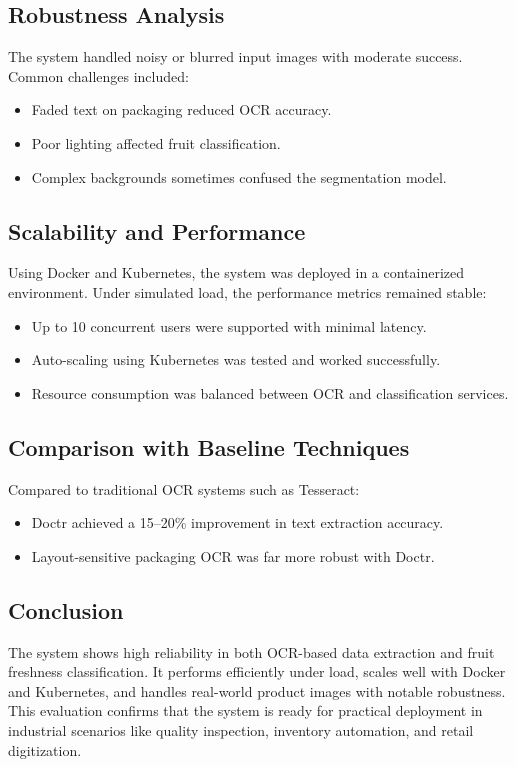 \documentclass[12pt]{report}
\begin{document}
\subsection{Robustness Analysis}

The system handled noisy or blurred input images with moderate success. Common challenges included:
\begin{itemize}
    \item Faded text on packaging reduced OCR accuracy.
    \item Poor lighting affected fruit classification.
    \item Complex backgrounds sometimes confused the segmentation model.
\end{itemize}

\subsection{Scalability and Performance}

Using Docker and Kubernetes, the system was deployed in a containerized environment. Under simulated load, the performance metrics remained stable:
\begin{itemize}
    \item Up to 10 concurrent users were supported with minimal latency.
    \item Auto-scaling using Kubernetes was tested and worked successfully.
    \item Resource consumption was balanced between OCR and classification services.
\end{itemize}

\subsection{Comparison with Baseline Techniques}

Compared to traditional OCR systems such as Tesseract:
\begin{itemize}
    \item Doctr achieved a 15–20\% improvement in text extraction accuracy.
    \item Layout-sensitive packaging OCR was far more robust with Doctr.
\end{itemize}

\subsection{Conclusion}

The system shows high reliability in both OCR-based data extraction and fruit freshness classification. It performs efficiently under load, scales well with Docker and Kubernetes, and handles real-world product images with notable robustness. This evaluation confirms that the system is ready for practical deployment in industrial scenarios like quality inspection, inventory automation, and retail digitization.
\end{document}
